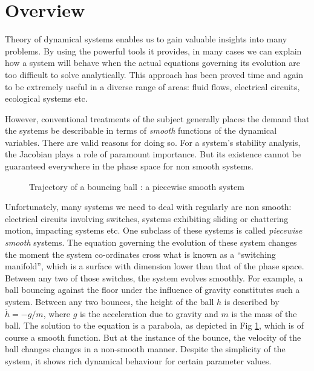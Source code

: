 \documentclass{book}
\renewcommand{\(}{\begin{columns}}
\renewcommand{\)}{\end{columns}}
\newcommand{\<}[1]{\begin{column}{#1}}
\renewcommand{\>}{\end{column}}
\begin{document}
\section{Overview}
Theory of dynamical systems enables us to gain valuable insights into many problems.  By using the powerful 
tools it provides, in many cases we can explain how a system will behave 
when the actual equations governing its evolution are too difficult to solve 
analytically.  This approach has been proved time and again to be extremely 
useful in a diverse range of areas: fluid flows, electrical circuits, 
ecological systems etc.  

However, conventional treatments of the subject generally places the demand 
that the systems be describable in terms of \emph{smooth} functions of the 
dynamical variables. There are valid reasons for doing so.  For a system's 
stability analysis, the Jacobian plays a role of paramount importance.  But 
its existence cannot be guaranteed everywhere in the phase space for non 
smooth systems.  


\begin{figure}[!htp]
\centering
\caption{Trajectory of a bouncing ball : a piecewise smooth system}
\label{fig-bouncing_ball}
\def\svgwidth{0.4\columnwidth}

\end{figure}


Unfortunately, many systems we need to deal with regularly are non smooth: 
electrical circuits involving switches, systems exhibiting sliding or 
chattering motion, impacting systems etc.  One subclass of these systems is 
called  \emph{piecewise smooth} systems. The equation governing the evolution 
of these system changes the moment  the system 
co-ordinates cross what is known as a ``switching manifold'', which is a 
surface with 
dimension lower than that of the phase space.  Between any two of those 
switches, the system evolves smoothly. For example, a ball bouncing against 
the floor under the influence of gravity constitutes such a system.  Between 
any two bounces, the height of the ball $h$ is described by $\ddot{h}=-g/m$, 
where $g$ is the acceleration due to gravity and $m$ is the mass of the ball.  
The solution to the equation is a parabola, as depicted in Fig 
\ref{fig-bouncing_ball}, which is of course a smooth function.  But at the 
instance of the bounce, the velocity of the ball changes changes in a 
non-smooth manner.  Despite the simplicity of the system, it shows rich 
dynamical behaviour for certain parameter values\cite{2010arXiv1002.2448O}.  
\end{document}
